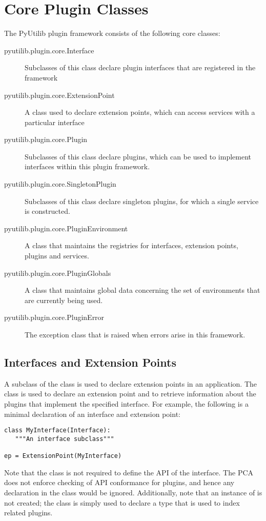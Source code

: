 \section{Core Plugin Classes}

The PyUtilib plugin framework consists of the following core classes:
\begin{description}
\item[pyutilib.plugin.core.Interface] Subclasses of this class declare plugin interfaces that are registered in the framework 
\item[pyutilib.plugin.core.ExtensionPoint] A class used to declare extension points, which can access services with a particular interface 
\item[pyutilib.plugin.core.Plugin] Subclasses of this class declare plugins, which can be used to implement interfaces within this plugin framework. 
\item[pyutilib.plugin.core.SingletonPlugin] Subclasses of this class declare singleton plugins, for which a single service is constructed. 
\item[pyutilib.plugin.core.PluginEnvironment] A class that maintains the registries for interfaces, extension points, plugins and services. 
\item[pyutilib.plugin.core.PluginGlobals] A class that maintains global data concerning the set of environments that are currently being used. 
\item[pyutilib.plugin.core.PluginError] The exception class that is raised when errors arise in this framework. 
\end{description}

\subsection{Interfaces and Extension Points}

A subclass of the  class is used to declare extension
points in an application. The  class is used to declare
an extension point and to retrieve information about the plugins that
implement the specified interface. For example, the following is a
minimal declaration of an interface and extension point:
\begin{lstlisting}
class MyInterface(Interface):
   """An interface subclass"""

ep = ExtensionPoint(MyInterface)
\end{lstlisting}
Note that the  class is not required to define the API of the
interface. The PCA does not enforce checking of
API conformance for plugins, and hence any declaration in the 
class would be ignored. Additionally, note that an instance of 
is not created; the  class is simply used to declare a type that is used to index related plugins.

